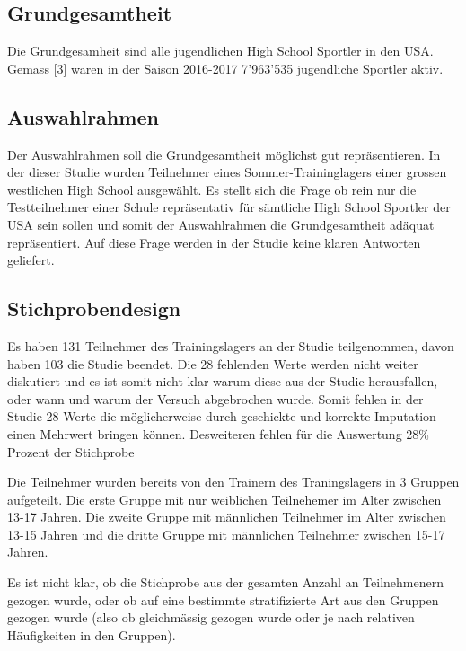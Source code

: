 \documentclass[
]{article}
\begin{document}
\hypertarget{grundgesamtheit}{%
\subsection{Grundgesamtheit}\label{grundgesamtheit}}

Die Grundgesamheit sind alle jugendlichen High School Sportler in den
USA. Gemass {[}3{]} waren in der Saison 2016-2017 7'963'535 jugendliche
Sportler aktiv.

\hypertarget{auswahlrahmen}{%
\subsection{Auswahlrahmen}\label{auswahlrahmen}}

Der Auswahlrahmen soll die Grundgesamtheit möglichst gut repräsentieren.
In der dieser Studie wurden Teilnehmer eines Sommer-Traininglagers einer
grossen westlichen High School ausgewählt. Es stellt sich die Frage ob
rein nur die Testteilnehmer einer Schule repräsentativ für sämtliche
High School Sportler der USA sein sollen und somit der Auswahlrahmen die
Grundgesamtheit adäquat repräsentiert. Auf diese Frage werden in der
Studie keine klaren Antworten geliefert.

\hypertarget{stichprobendesign}{%
\subsection{Stichprobendesign}\label{stichprobendesign}}

Es haben 131 Teilnehmer des Trainingslagers an der Studie teilgenommen,
davon haben 103 die Studie beendet. Die 28 fehlenden Werte werden nicht
weiter diskutiert und es ist somit nicht klar warum diese aus der Studie
herausfallen, oder wann und warum der Versuch abgebrochen wurde. Somit
fehlen in der Studie 28 Werte die möglicherweise durch geschickte und
korrekte Imputation einen Mehrwert bringen können. Desweiteren fehlen
für die Auswertung 28\% Prozent der Stichprobe

Die Teilnehmer wurden bereits von den Trainern des Traningslagers in 3
Gruppen aufgeteilt. Die erste Gruppe mit nur weiblichen Teilnehemer im
Alter zwischen 13-17 Jahren. Die zweite Gruppe mit männlichen Teilnehmer
im Alter zwischen 13-15 Jahren und die dritte Gruppe mit männlichen
Teilnehmer zwischen 15-17 Jahren.

Es ist nicht klar, ob die Stichprobe aus der gesamten Anzahl an
Teilnehmenern gezogen wurde, oder ob auf eine bestimmte stratifizierte
Art aus den Gruppen gezogen wurde (also ob gleichmässig gezogen wurde
oder je nach relativen Häufigkeiten in den Gruppen).
\end{document}

